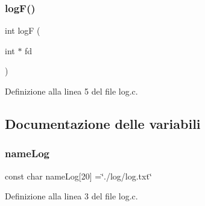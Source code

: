 \mbox{\label{a00026_a1ed8934d63b9109e59342857ed872179}} 
\subsubsection{\texorpdfstring{logF()}{logF()}}
{\footnotesize\ttfamily int logF (\begin{DoxyParamCaption}\item[{int $\ast$}]{fd }\end{DoxyParamCaption})}



Definizione alla linea 5 del file log.\+c.



\subsection{Documentazione delle variabili}
\mbox{\label{a00026_a85c26d71289737af4273c9c226ebf5f7}} 
\subsubsection{\texorpdfstring{nameLog}{nameLog}}
{\footnotesize\ttfamily const char name\+Log\mbox{[}20\mbox{]} =\char`\"{}./log/log.\+txt\char`\"{}}



Definizione alla linea 3 del file log.\+c.

